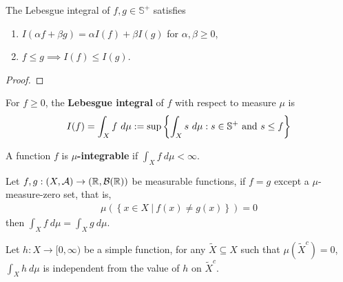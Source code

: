 \documentclass[11pt]{article}
\begin{document}
	\begin{theorem}
		The Lebesgue integral of $f, g \in \mathbb{S}^+$ satisfies
		\begin{enumerate}
			\item $I(\alpha f + \beta g) = \alpha I(f) + \beta I(g)$ for $\alpha, \beta \geq 0$,
			\item $f \leq g \implies I(f) \leq I(g)$.
		\end{enumerate}
	\end{theorem}
	
	\begin{proof}
		
	\end{proof}
	
	\begin{definition}
		For $f \geq 0$, the \textbf{Lebesgue integral} of $f$ with respect to measure $\mu$ is
		\begin{align}
			I(f) = \int_X f\ d\mu := \sup\left\{\int_X s\ d\mu: s \in \mathbb{S}^+ \text{{ and }} s \leq f \right\}
		\end{align}
	\end{definition}
	
	\begin{definition}
		A function $f$ is \textbf{$\mu$-integrable} if $\int_X f\ d\mu < \infty$.
	\end{definition}
	
	\begin{theorem}\label{thm:1}
		Let $f, g: (X, \mathcal{{A}}) \to (\mathbb{R}, \mathcal{{B}}(\mathbb{R}))$ be measurable functions, if $f = g$ except a $\mu$-measure-zero set, that is,
		\begin{align}
			\mu\left(\left\{
				x \in X\ |\ f(x) \neq g(x)
			\right\}\right) = 0
		\end{align}
		then $\int_X f\ d\mu = \int_X g\ d\mu$.
	\end{theorem}
	
	\begin{lemma}\label{lem:1}
		Let $h: X \to [0, \infty)$ be a simple function, for any $\tilde{X} \subseteq X$ such that $\mu(\tilde{X}^c) = 0$, $\int_X h\ d\mu$ is independent from the value of $h$ on $\tilde{X}^c$.
	\end{lemma}
	
\end{document}
